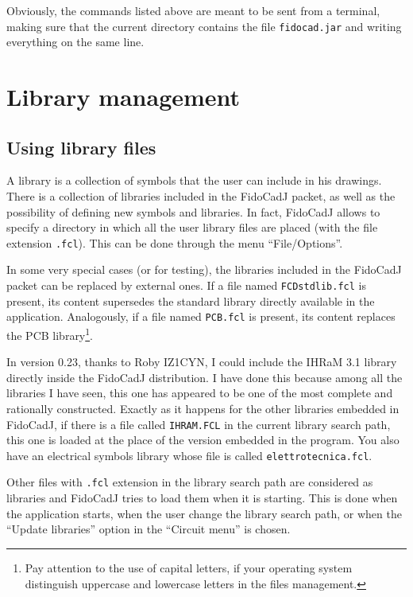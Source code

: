 \documentclass[10pt,a4paper,twoside]{scrreprt}
\begin{document}
Obviously, the commands listed above are meant to be sent from a terminal,
making sure that the current directory contains the file \lstinline!fidocad.jar!
and writing everything on the same line.

\lstset{language=FIDOCAD,
 basicstyle=\small\ttfamily}

\section{Library management}
\subsection{Using library files}
A library is a collection of symbols that the user can include in his drawings. There is a collection of libraries included in the FidoCadJ packet, as well as the possibility of defining new symbols and libraries.
In fact, FidoCadJ allows to specify a directory in which all the user library files are placed (with the file extension \lstinline!.fcl!). This can be done through the menu ``File/Options''.

In some very special cases (or for testing), the libraries included in the FidoCadJ packet can be replaced by external ones.
If a file named \lstinline!FCDstdlib.fcl!
is present, its content supersedes the standard library directly available in the application. Analogously, if a file named
\lstinline!PCB.fcl! is present, its content replaces the PCB
library\footnote{Pay attention to the use of capital letters, if your operating system distinguish uppercase and lowercase letters in the
files management.}.

In version 0.23, thanks to Roby IZ1CYN, I could include the IHRaM 3.1 library directly inside the FidoCadJ distribution. I have done this because among all the libraries I have seen, this one has appeared to be one of the most complete and rationally constructed.
Exactly as it happens for the other libraries embedded in FidoCadJ, if there is a file called \lstinline!IHRAM.FCL! in the current library search path, this one is loaded at the place of the version embedded in the program. You also have an electrical symbols library whose file is called \lstinline!elettrotecnica.fcl!.

Other files with \lstinline!.fcl! extension in the library search path are considered as libraries and FidoCadJ tries to load them when it is starting. This is done when the application starts, when the user change the library search path, or when the ``Update libraries'' option in the ``Circuit menu'' is chosen.
\end{document}
